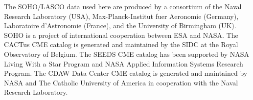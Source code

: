 \documentclass[referee,a4paper,12pt,traditabstract]{swsc}
\begin{document}
\begin{linenumbers}





\begin{acknowledgements}
     
The SOHO/LASCO data used here are produced by a consortium of the Naval Research Laboratory (USA), Max-Planck-Institut fuer Aeronomie (Germany), Laboratoire d'Astronomie (France), and the University of Birmingham (UK). SOHO is a project of international cooperation between ESA and NASA.
The CACTus CME catalog is generated and maintained by the SIDC at the Royal Observatory of Belgium.
The SEEDS CME catalog has been supported by NASA Living With a Star Program and NASA Applied Information Systems Research Program.
The CDAW Data Center CME catalog is generated and maintained by NASA and The Catholic University of America in cooperation with the Naval Research Laboratory.      
     
\end{acknowledgements}


%

  

\end{linenumbers}
\end{document}
